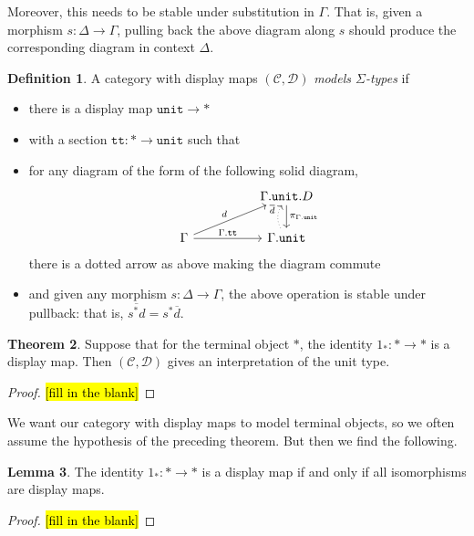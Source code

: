 \documentclass{article}
\theoremstyle{definition}
\newtheorem{definition}{Definition}[section]
\newtheorem{theorem}[definition]{Theorem}
\newtheorem{lemma}[definition]{Lemma}
\newcommand{\C}{\mathcal C}
\newcommand{\D}{\mathcal D}
\begin{document}
Moreover, this needs to be stable under substitution in $\Gamma$. That is, given a morphism $s: \Delta \to \Gamma$, pulling back the above diagram along $s$ should produce the corresponding diagram in context $\Delta$.

\begin{definition}
    A category with display maps $(\C,\D)$ \emph{models $\Sigma$-types} if 
    \begin{itemize}
    \item there is a display map $\mathtt{unit} \to *$
    \item with a section $\mathtt{tt} : * \to \mathtt{unit}$ such that
    \item for any diagram of the form of the following solid diagram, 
    \[
     \begin{tikzcd}
         && \Gamma.\mathtt{unit}. D \ar[d,"\pi_{\Gamma.\mathtt{unit}}"] \\
         \Gamma \ar[rr,"\Gamma.\mathtt{tt}"] \ar[urr," d"] && \Gamma.\mathtt{unit} \ar[u,bend left,"\overline d",dotted]
     \end{tikzcd}
    \]
    there is a dotted arrow as above making the diagram commute
    \item and given any morphism $s: \Delta \to \Gamma$, the above operation is stable under pullback: that is, $\overline{s^* d} = s^* \overline d$.
    \end{itemize}
\end{definition}

\begin{theorem}
    Suppose that for the terminal object $*$, the identity $1_* : * \to *$ is a display map. Then $(\C,\D)$ gives an interpretation of the unit type.
\end{theorem}
\begin{proof}
    \hl{[fill in the blank]}
\end{proof}

We want our category with display maps to model terminal objects, so we often assume the hypothesis of the preceding theorem. But then we find the following.

\begin{lemma}
    The identity $1_* : * \to *$ is a display map if and only if all isomorphisms are display maps.
\end{lemma}
\begin{proof}
    \hl{[fill in the blank]}
\end{proof}
\end{document}

